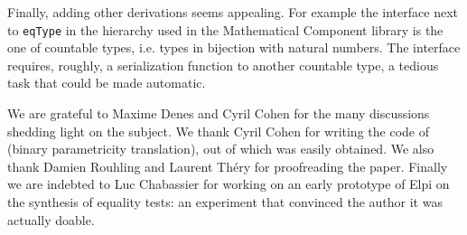\documentclass[sigplan,10pt,review]{acmart}\settopmatter{printfolios=true,printccs=false,printacmref=false}
\newcommand{\derive}[1]{\keys{#1}}
\begin{document}
Finally, adding other derivations seems appealing. For example
the interface next to \lstinline+eqType+ in the hierarchy used
in the Mathematical Component library is the one of countable types,
i.e. types in bijection with natural numbers. The interface
requires, roughly, a serialization function to another countable
type, a tedious task that could be made automatic.

\begin{acks}
We are grateful to Maxime Denes and Cyril Cohen for the many discussions
shedding light on the subject. We thank Cyril Cohen for writing the code 
of \derive{param2} (binary parametricity translation), out of which
\derive{param1} was easily obtained.  
We also thank Damien Rouhling and Laurent Th\'ery for proofreading the paper.
Finally we are indebted
to Luc Chabassier for working on an early prototype of Elpi on
the synthesis of equality tests: an experiment that convinced
the author it was actually doable.
\end{acks}





\end{document}
